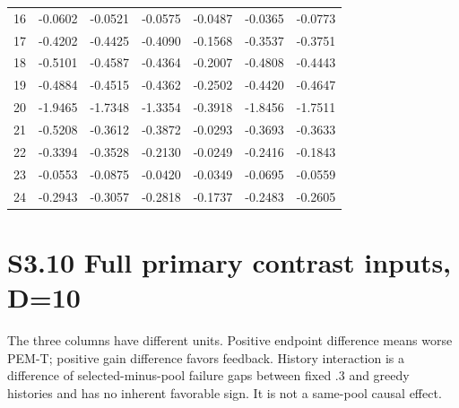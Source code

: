 \documentclass[11pt,a4paper]{article}
\begin{document}
\begin{minipage}{\linewidth}
\begin{longtable}[]{@{}lllllll@{}}
16 & -0.0602 & -0.0521 & -0.0575 & -0.0487 & -0.0365 & -0.0773 \\
17 & -0.4202 & -0.4425 & -0.4090 & -0.1568 & -0.3537 & -0.3751 \\
18 & -0.5101 & -0.4587 & -0.4364 & -0.2007 & -0.4808 & -0.4443 \\
19 & -0.4884 & -0.4515 & -0.4362 & -0.2502 & -0.4420 & -0.4647 \\
20 & -1.9465 & -1.7348 & -1.3354 & -0.3918 & -1.8456 & -1.7511 \\
21 & -0.5208 & -0.3612 & -0.3872 & -0.0293 & -0.3693 & -0.3633 \\
22 & -0.3394 & -0.3528 & -0.2130 & -0.0249 & -0.2416 & -0.1843 \\
23 & -0.0553 & -0.0875 & -0.0420 & -0.0349 & -0.0695 & -0.0559 \\
24 & -0.2943 & -0.3057 & -0.2818 & -0.1737 & -0.2483 & -0.2605 \\
\bottomrule
\end{longtable}

\end{minipage}\par

\newpage

\hypertarget{s3.10-full-primary-contrast-inputs-d10}{%
\section{S3.10 Full primary contrast inputs,
D=10}\label{s3.10-full-primary-contrast-inputs-d10}}

The three columns have different units. Positive endpoint difference
means worse PEM-T; positive gain difference favors feedback. History
interaction is a difference of selected-minus-pool failure gaps between
fixed .3 and greedy histories and has no inherent favorable sign. It is
not a same-pool causal effect.
\end{document}
